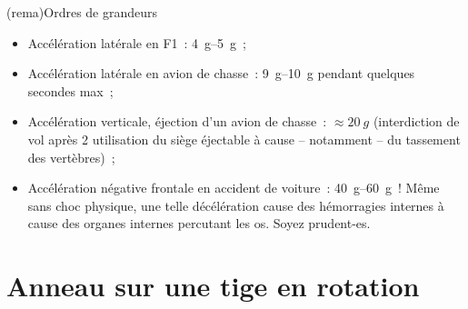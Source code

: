 \documentclass[a4paper, 12pt, final, garamond]{book}
\begin{document}

\begin{tcb}(rema){Ordres de grandeurs}
	\begin{itemize}[label=$\diamond$]
		\item Accélération latérale en F1~: \SIrange{4}{5}{g}~;
		\item Accélération latérale en avion de chasse~: \SIrange{9}{10}{g}
		      pendant quelques secondes max~;
		\item Accélération verticale, éjection d'un avion de chasse~: $\approx
			      \SI{20}{g}$ (interdiction de vol après 2 utilisation du siège
		      éjectable à cause – notamment – du tassement des vertèbres)~;
		\item Accélération négative frontale en accident de voiture~:
		      \SIrange{40}{60}{g}~! Même sans choc physique, une telle
		      décélération cause des hémorragies internes à cause des organes
		      internes percutant les os. Soyez prudent-es.
	\end{itemize}
\end{tcb}
\resetQ
\section{Anneau sur une tige en rotation}
\end{document}
